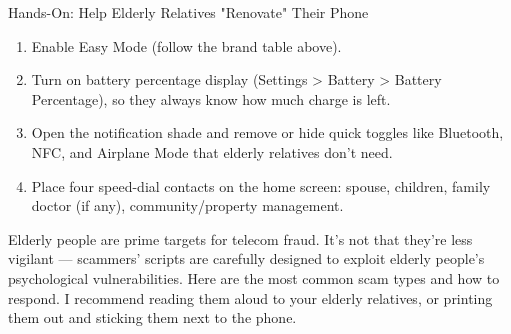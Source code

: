 \begin{tcbpractice}{Hands-On: Help Elderly Relatives "Renovate" Their Phone}
\begin{enumerate}
  \item Enable Easy Mode (follow the brand table above).
  \item Turn on battery percentage display (Settings > Battery > Battery Percentage), so they always know how much charge is left.
  \item Open the notification shade and remove or hide quick toggles like Bluetooth, NFC, and Airplane Mode that elderly relatives don't need.
  \item Place four speed-dial contacts on the home screen: spouse, children, family doctor (if any), community/property management.
\end{enumerate}

\end{tcbpractice}


Elderly people are prime targets for telecom fraud. It's not that they're less vigilant — scammers' scripts are carefully designed to exploit elderly people's psychological vulnerabilities. Here are the most common scam types and how to respond. I recommend reading them aloud to your elderly relatives, or printing them out and sticking them next to the phone.


